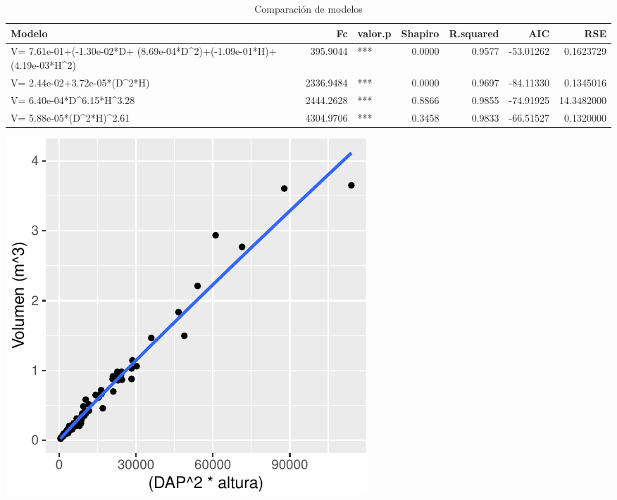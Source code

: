 \documentclass[9pt,onecolumn,twoside,]{pinp}
\begin{document}
\begin{table}

\caption{\label{tab:unnamed-chunk-9}Comparación de modelos}
\centering
\begin{tabular}[t]{l|r|l|r|r|r|r}
\hline
Modelo & Fc & valor.p & Shapiro & R.squared & AIC & RSE\\
\hline
V= 7.61e-01+(-1.30e-02*D+
               (8.69e-04*D\textasciicircum{}2)+(-1.09e-01*H)+
               (4.19e-03*H\textasciicircum{}2) & 395.9044 & *** & 0.0000 & 0.9577 & -53.01262 & 0.1623729\\
\hline
V= 2.44e-02+3.72e-05*(D\textasciicircum{}2*H) & 2336.9484 & *** & 0.0000 & 0.9697 & -84.11330 & 0.1345016\\
\hline
V= 6.40e-04*D\textasciicircum{}6.15*H\textasciicircum{}3.28 & 2444.2628 & *** & 0.8866 & 0.9855 & -74.91925 & 14.3482000\\
\hline
V= 5.88e-05*(D\textasciicircum{}2*H)\textasciicircum{}2.61 & 4304.9706 & *** & 0.3458 & 0.9833 & -66.51527 & 0.1320000\\
\hline
\end{tabular}
\end{table}

\begin{center}\includegraphics{David_Londono_Lopera_Cristian_Ganan_parcial3_files/figure-latex/unnamed-chunk-10-1} \end{center}
\end{document}
